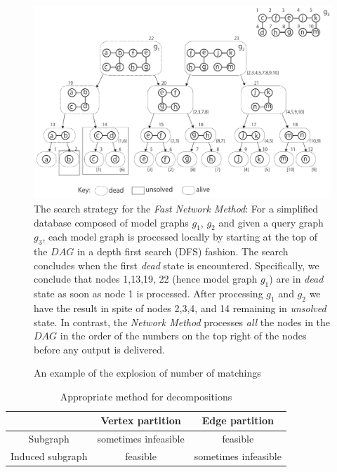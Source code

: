 \begin{figure}
\centering
\includegraphics[width=1.0\textwidth]{dag_search_optimize.pdf}
\caption{The search strategy for the \textit{Fast Network Method}: For a simplified database composed of model graphs $g_1$, $g_2$ and  given a query graph $g_3$, each model graph is processed locally by starting at the top of the $DAG$ in a depth first search (DFS) fashion. 
The search concludes when the first \textit{dead} state is encountered. 
Specifically, we conclude that nodes 1,13,19, 22 (hence model graph $g_1$) are in \textit{dead} state as soon as node 1 is processed. 
After processing $g_1$ and $g_2$ we have the result in spite of nodes 2,3,4, and 14 remaining in \textit{unsolved} state. 
In contrast, the \textit{Network Method} processes \textit{all} the nodes in the $DAG$ in the order of the numbers on the top right of the nodes before any output is delivered.}
\label{fig:fig3}
\end{figure}

\begin{figure}
        \centering
        
        \caption{An example of the explosion of number of matchings \label{fig:fig4} }
\end{figure}

\begin{table}
\begin{center}\begin{tabular}{|c|c|c|}
\hline
  & Vertex partition  & Edge partition  \\ \hline
Subgraph & sometimes infeasible  & feasible \\ \hline
Induced subgraph & feasible & sometimes  infeasible \\ \hline
\end{tabular}
\caption{Appropriate method for decompositions \label{tab:table1} }
\end{center}
\end{table}


